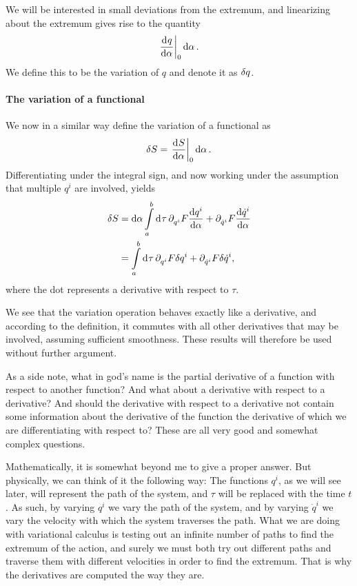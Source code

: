 We will be interested in small deviations from the extremum, and linearizing about the extremum gives rise to the quantity
\begin{align*}
	\deval{q}{\alpha}{0}\dd{\alpha}.
\end{align*}
We define this to be the variation of $q$ and denote it as $\delta q$.


\paragraph{The variation of a functional}
We now in a similar way define the variation of a functional as
\begin{align*}
	\var{S} = \deval{S}{\alpha}{0}\dd{\alpha}.
\end{align*}
Differentiating under the integral sign, and now working under the assumption that multiple $q^{i}$ are involved, yields
\begin{align*}
	\delta S &= \dd{\alpha}\int\limits_{a}^{b}\dd[]{\tau}\partial^{}_{q^{i}}F\dv{q^{i}}{\alpha} + \partial^{}_{\dot{q}^{i}}F\dv{\dot{q}^{i}}{\alpha} \\
	        &= \int\limits_{a}^{b}\dd[]{\tau}\partial^{}_{q^{i}}F\delta q^{i} + \partial^{}_{\dot{q}^{i}}F\delta \dot{q}^{i},
\end{align*}
where the dot represents a derivative with respect to $\tau$.

We see that the variation operation behaves exactly like a derivative, and according to the definition, it commutes with all other derivatives that may be involved, assuming sufficient smoothness. These results will therefore be used without further argument.

As a side note, what in god's name is the partial derivative of a function with respect to another function? And what about a derivative with respect to a derivative? And should the derivative with respect to a derivative not contain some information about the derivative of the function the derivative of which we are differentiating with respect to? These are all very good and somewhat complex questions.

Mathematically, it is somewhat beyond me to give a proper answer. But physically, we can think of it the following way: The functions $q^{i}$, as we will see later, will represent the path of the system, and $\tau$ will be replaced with the time $t$. As such, by varying $q^{i}$ we vary the path of the system, and by varying $\dot{q}^{i}$ we vary the velocity with which the system traverses the path. What we are doing with variational calculus is testing out an infinite number of paths to find the extremum of the action, and surely we must both try out different paths and traverse them with different velocities in order to find the extremum. That is why the derivatives are computed the way they are.

